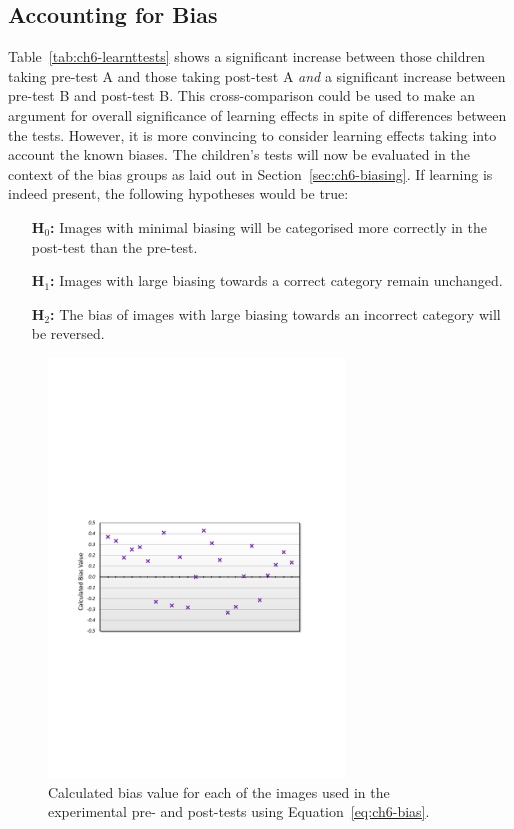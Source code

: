 \subsection{Accounting for Bias} \label{sec:ch6-results-bias}
Table~\ref{tab:ch6-learnttests} shows a significant increase between those children taking pre-test A and those taking post-test A \textit{and} a significant increase between pre-test B and post-test B. This cross-comparison could be used to make an argument for overall significance of learning effects in spite of differences between the tests. However, it is more convincing to consider learning effects taking into account the known biases. The children's tests will now be evaluated in the context of the bias groups as laid out in Section~\ref{sec:ch6-biasing}. If learning is indeed present, the following hypotheses would be true:
\begin{itemize}
	\item [\textbf{H$_{0}$:}] Images with minimal biasing will be categorised more correctly in the post-test than the pre-test.
	\item [\textbf{H$_{1}$:}] Images with large biasing towards a correct category remain unchanged.
	\item [\textbf{H$_{2}$:}] The bias of images with large biasing towards an incorrect category will be reversed.
\end{itemize}

\begin{figure}[t!]
    \centering
    \includegraphics[width=0.7\textwidth]{images/ch6_BiasScatter.pdf}
    \caption{Calculated bias value for each of the images used in the experimental pre- and post-tests using Equation~\ref{eq:ch6-bias}.}
    \label{fig:ch6-biasscatter}
\end{figure}

